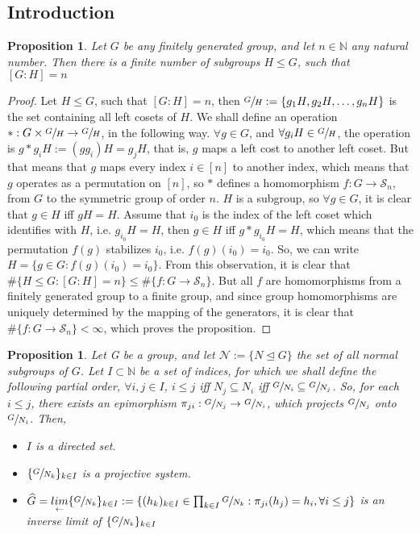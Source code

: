\documentclass[12pt]{article}
\newtheorem{proposition}[theorem]{Proposition}
\begin{document}
\subsection{Introduction}
\begin{proposition} \label{prop:finite.number.subgroups}
Let $G$ be any finitely generated group, and let $n\in\mathbb{N}$ any natural number. Then there is a finite number of subgroups $H\leq G$, such that $[G:H]=n$
\end{proposition}
\begin{proof}
Let $H\leq G$, such that $[G:H]=n$, then $\sfrac{G}{H}:=\{g_1H,g_2H,\dots,g_nH\}$ is the set containing all left cosets of $H$. We shall define an operation $*:G\times\sfrac{G}{H}\rightarrow \sfrac{G}{H}$, in the following way. $\forall g\in G$, and $\forall g_iH\in\sfrac{G}{H}$, the operation is $g*g_iH:=(gg_i)H=g_jH$, that is, $g$ maps a left cost to another left coset. But that means that $g$ maps every index $i\in [n]$ to another index, which means that $g$ operates as a permutation on $[n]$, so $*$ defines a homomorphism $f:G\rightarrow\mathcal{S}_n$, from $G$ to the symmetric group of order $n$. $H$ is a subgroup, so $\forall g\in G$, it is clear that $g\in H$ iff $gH=H$. Assume that $i_0$  is the index of the left coset which identifies with $H$, i.e. $g_{i_0}H=H$, then $g\in H$ iff $g*g_{i_0}H=H$, which means that the permutation $f(g)$ stabilizes $i_0$, i.e. $f(g)(i_0)=i_0$. So, we can write $H=\{g\in G : f(g)(i_0)=i_0\}$. From this observation, it is clear that $\#\{H\leq G : [G:H]=n\}\leq\#\{f:G\rightarrow \mathcal{S}_n\}$. But all $f$ are homomorphisms from a finitely generated group to a finite group, and since group homomorphisms are uniquely determined by the mapping of the generators, it is clear that $\#\{f:G\rightarrow \mathcal{S}_n\}<\infty$, which proves the proposition.
\end{proof}
\begin{proposition}
\label{prop:inverse.limit}
Let G be a group, and let $\mathcal{N}:=\{N\trianglelefteq G\}$ the set of all normal subgroups of $G$. Let $I\subset\mathbb{N}$ be a set of indices, for which we shall define the following partial order, $\forall i,j\in I$, $i\leq j$ iff $N_j\subseteq N_i$ iff $\sfrac{G}{N_i}\subseteq\sfrac{G}{N_j}$. So, for each $i\leq j$, there exists an epimorphism $\pi_{ji}:\sfrac{G}{N_
j}\rightarrow\sfrac{G}{N_i}$, which projects $\sfrac{G}{N_
j}$ onto $\sfrac{G}{N_
i}$. Then,
\begin{itemize}
  \item $I$ is a directed set.
  \item $\{\sfrac{G}{N_k}\}_{k\in I}$ is a projective system.
  \item $\widehat{G}=\underset{\leftarrow}{lim}\{\sfrac{G}{N_k}\}_{k\in I}:=\{(h_k)_{k\in I}\in\prod_{k\in I}\sfrac{G}{N_k} : \pi_{ji}(h_j)=h_i,\forall i\leq j\}$ is an inverse limit of $\{\sfrac{G}{N_k}\}_{k\in I}$
\end{itemize}
\end{proposition}
\end{document}
